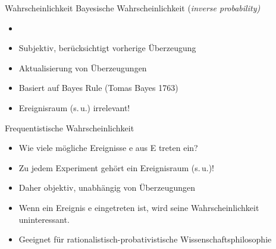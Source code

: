 \begin{frame}
  {Wahrscheinlichkeit}
  Bayesische Wahrscheinlichkeit (\textit{inverse probability)}\\
  \begin{itemize}[<+->]
    \item {}
    \item Subjektiv, berücksichtigt vorherige Überzeugung
    \item Aktualisierung von Überzeugungen
    \item Basiert auf \alert{Bayes Rule} (Tomas Bayes 1763)
    \item \alert{Ereignisraum} (s.\,u.) irrelevant!
  \end{itemize}
  \Zeile
  Frequentistische Wahrscheinlichkeit\\
  \begin{itemize}[<+->]
    \item \alert{Wie viele mögliche Ereignisse e aus E treten ein?}
    \item Zu jedem Experiment gehört ein \alert{Ereignisraum} (s.\,u.)!
    \item Daher \alert{objektiv}, unabhängig von Überzeugungen
    \item \alert{Wenn ein Ereignis e eingetreten ist, wird seine Wahrscheinlichkeit uninteressant.}
    \item Geeignet für rationalistisch-probativistische Wissenschaftsphilosophie
  \end{itemize}
\end{frame}

